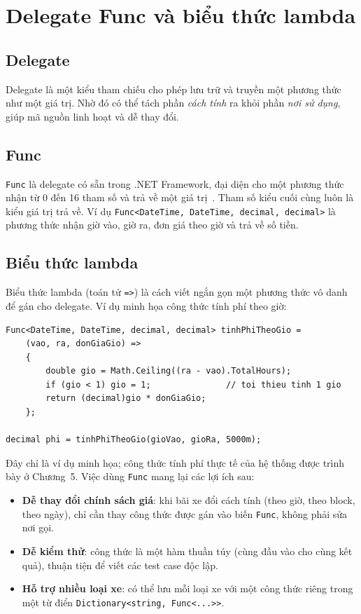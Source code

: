 \section{Delegate Func và biểu thức lambda}

\subsection{Delegate}

Delegate là một kiểu tham chiếu cho phép lưu trữ và truyền một phương thức như một giá trị. Nhờ đó có thể tách phần \textit{cách tính} ra khỏi phần \textit{nơi sử dụng}, giúp mã nguồn linh hoạt và dễ thay đổi.

\subsection{Func}

\texttt{Func} là delegate có sẵn trong .NET Framework, đại diện cho một phương thức nhận từ 0 đến 16 tham số và trả về một giá trị~\cite{msdocs_func}. Tham số kiểu cuối cùng luôn là kiểu giá trị trả về. Ví dụ \texttt{Func<DateTime, DateTime, decimal, decimal>} là phương thức nhận giờ vào, giờ ra, đơn giá theo giờ và trả về số tiền.

\subsection{Biểu thức lambda}

Biểu thức lambda (toán tử \texttt{=>}) là cách viết ngắn gọn một phương thức vô danh để gán cho delegate. Ví dụ minh họa công thức tính phí theo giờ:

\begin{lstlisting}
Func<DateTime, DateTime, decimal, decimal> tinhPhiTheoGio =
    (vao, ra, donGiaGio) =>
    {
        double gio = Math.Ceiling((ra - vao).TotalHours);
        if (gio < 1) gio = 1;               // toi thieu tinh 1 gio
        return (decimal)gio * donGiaGio;
    };

decimal phi = tinhPhiTheoGio(gioVao, gioRa, 5000m);
\end{lstlisting}

Đây chỉ là ví dụ minh họa; công thức tính phí thực tế của hệ thống được trình bày ở Chương~5. Việc dùng \texttt{Func} mang lại các lợi ích sau:

\begin{itemize}
  \item \textbf{Dễ thay đổi chính sách giá}: khi bãi xe đổi cách tính (theo giờ, theo block, theo ngày), chỉ cần thay công thức được gán vào biến \texttt{Func}, không phải sửa nơi gọi.
  \item \textbf{Dễ kiểm thử}: công thức là một hàm thuần túy (cùng đầu vào cho cùng kết quả), thuận tiện để viết các test case độc lập.
  \item \textbf{Hỗ trợ nhiều loại xe}: có thể lưu mỗi loại xe với một công thức riêng trong một từ điển \texttt{Dictionary<string, Func<...>>}.
\end{itemize}


